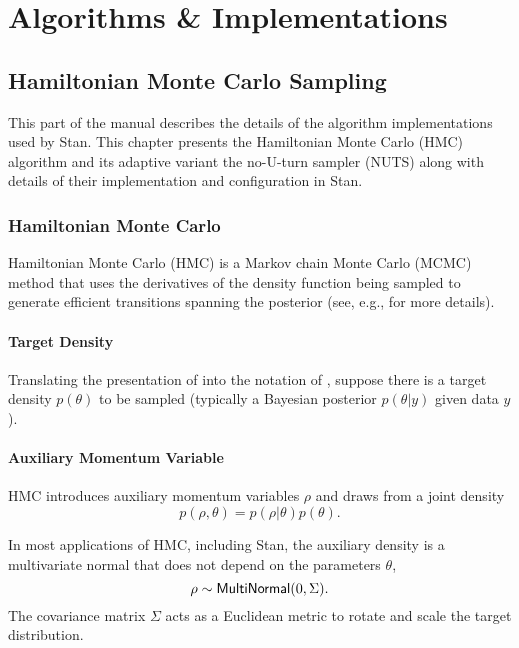 \part{Algorithms \& Implementations}

\chapter{Hamiltonian Monte Carlo Sampling}

This part of the manual describes the details of the algorithm
implementations used by Stan. This chapter presents the Hamiltonian
Monte Carlo (HMC) algorithm and its adaptive variant the no-U-turn
sampler (NUTS) along with details of their implementation and
configuration in Stan.

\section{Hamiltonian Monte Carlo}

Hamiltonian Monte Carlo (HMC) is a Markov chain Monte Carlo (MCMC)
method that uses the derivatives of the density function being sampled
to generate efficient transitions spanning the posterior (see, e.g.,
\citep{Betancourt-Girolami:2013,Neal:2011} for more details).


\subsection{Target Density}

Translating the presentation of \citep{Betancourt-Girolami:2013} into
the notation of \citep{GelmanEtAl:2013}, suppose there is a target
density $p(\theta)$ to be sampled (typically a Bayesian posterior
$p(\theta|y)$ given data $y$).


\subsection{Auxiliary Momentum Variable}

HMC introduces auxiliary momentum variables $\rho$ and draws from a
joint density
%
\[
p(\rho,\theta) = p(\rho|\theta) p(\theta).
\]
%

In most applications of HMC, including Stan, the auxiliary density is
a multivariate normal that does not depend on the parameters $\theta$,
\[
\rho \sim \distro{MultiNormal}(0, \Sigma).
\]
The covariance matrix $\Sigma$ acts as a Euclidean metric to rotate
and scale the target distribution. 

